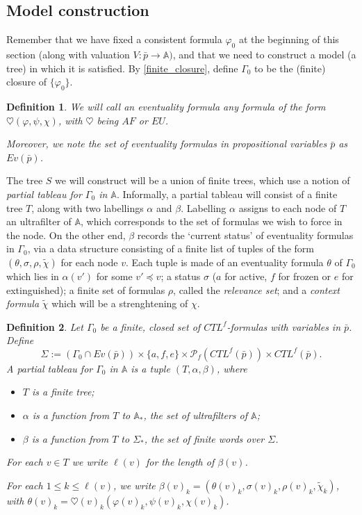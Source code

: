 \documentclass[11pt]{article}
\newcommand{\A}{{\mathbb A}}
\newcommand{\Evp}{{Ev(\bar{p})}}
\newtheorem{definition}{Definition}[section]
\begin{document}
\subsection*{Model construction}
Remember that we have fixed a consistent formula $\varphi_0$ at the beginning of this section (along with valuation $V:\bar{p}\to\A)$, and that we need to construct a model (a tree) in which it is satisfied. By \ref{finite_closure}, define $\Gamma_0$ to be the (finite) closure of $\{\varphi_0\}$.

\begin{definition}\label{eventuality_fml}
    We will call an \emph{eventuality formula} any formula of the form $\heartsuit(\varphi,\psi,\chi)$, with $\heartsuit$ being $AF$ or $EU$.

    Moreover, we note the set of eventuality formulas in propositional variables $\bar{p}$ as $\Evp$.
\end{definition}

The tree $S$ we will construct will be a union of finite trees, which use a notion of \emph{partial tableau for $\Gamma_0$ in $\A$}. Informally, a partial tableau will consist of a finite tree $T$, along with two labellings $\alpha$ and $\beta$. Labelling $\alpha$ assigns to each node of $T$ an ultrafilter of $\A$, which corresponds to the set of formulas we wish to force in the node. On the other end, $\beta$ records the `current status' of eventuality formulas in $\Gamma_0$, via a data structure consisting of a finite list of tuples of the form $(\theta,\sigma,\rho,\tilde{\chi})$ for each node $v$. Each tuple is made of an eventuality formula $\theta$ of $\Gamma_0$ which lies in $\alpha(v')$ for some $v'\preceq v$; a status $\sigma$ ($a$ for active, $f$ for frozen or $e$ for extinguished); a finite set of formulas $\rho$, called the \emph{relevance set}; and a \emph{context formula} $\tilde{\chi}$ which will be a strenghtening of $\chi$.

\begin{definition}\label{partial_tableau}
    Let $\Gamma_0$ be a finite, closed set of $CTL^f$-formulas with variables in $\bar{p}$. Define \[\Sigma:=(\Gamma_0\cap\Evp)\times\{a,f,e\}\times\mathcal{P}_f(CTL^f(\bar{p}))\times CTL^f(\bar{p}).\] A \emph{partial tableau for $\Gamma_0$ in $\A$} is a tuple $(T,\alpha,\beta)$, where
    \begin{itemize}
        \setlength\itemsep{0em}
        \item $T$ is a finite tree;
        \item $\alpha$ is a function from $T$ to $\A_*$, the set of ultrafilters of $\A$;
        \item $\beta$ is a function from $T$ to $\Sigma_*$, the set of finite words over $\Sigma$.
    \end{itemize}

    For each $v\in T$ we write $\ell(v)$ for the length of $\beta(v)$. 
    
    For each $1\leq k\leq \ell(v)$, we write $\beta(v)_k=(\theta(v)_k,\sigma(v)_k,\rho(v)_k,\tilde{\chi}_k)$, with $\theta(v)_k=\heartsuit(v)_k(\varphi(v)_k,\psi(v)_k,\chi(v)_k)$.
\end{definition}
\end{document}
